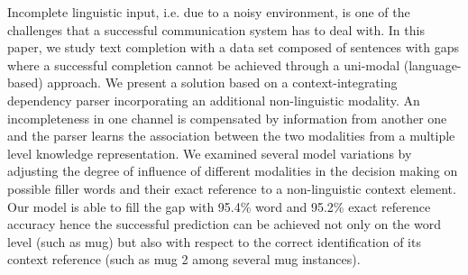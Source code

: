 Incomplete linguistic input, i.e. due to a noisy environment, is one of the challenges that a successful communication system has to deal with. In this paper, we study text completion with a data set composed of sentences with gaps where a successful completion cannot be achieved through a uni-modal (language-based) approach. We present a solution based on a context-integrating dependency parser incorporating an additional non-linguistic modality. An incompleteness in one channel is compensated by information from another one and the parser learns the association between the two modalities from a multiple level knowledge representation. We examined several model variations by adjusting the degree of influence of different modalities in the decision making on possible filler words and their exact reference to a non-linguistic context element. Our model is able to fill the gap with 95.4\% word and 95.2\% exact reference accuracy hence the successful prediction can be achieved not only on the word level (such as mug) but also with respect to the correct identification of its context reference (such as mug 2 among several mug instances).
